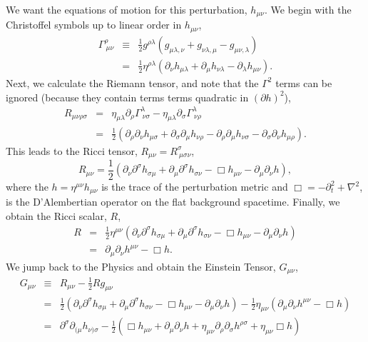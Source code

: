 We want the equations of motion for this perturbation, $h_{\mu\nu}$. We begin with the Christoffel symbols up to linear order in $h_{\mu\nu}$,
\begin{eqnarray}
    \Gamma^{\rho}_{\ \mu\nu}&\equiv&\frac{1}{2}g^{\rho\lambda}\left(g_{\mu\lambda,\nu} + g_{\nu\lambda, \mu} - g_{\mu\nu,\lambda}\right)\nonumber\\
    &=& \frac{1}{2}\eta^{\rho\lambda}(\partial_{\nu}h_{\mu\lambda} + \partial_{\mu}h_{\nu\lambda} - \partial_{\lambda}h_{\mu\nu}).
\end{eqnarray}
Next, we calculate the Riemann tensor, and note that the $\Gamma^2$ terms can be ignored (because they contain terms terms quadratic in $(\partial h)^2$),
\begin{eqnarray}
    R_{\mu\nu\rho\sigma} &=& \eta_{\mu\lambda}\partial_{\rho}\Gamma^{\lambda}_{\ \nu\sigma} - \eta_{\mu\lambda}\partial_{\sigma}\Gamma^{\lambda}_{\ \nu\rho}\nonumber \\
    &=& \frac{1}{2}\left(\partial_{\rho}\partial_{\nu}h_{\mu\sigma} + \partial_{\sigma}\partial_{\mu}h_{\nu\rho} - \partial_{\rho}\partial_{\mu}h_{\nu\sigma} - \partial_{\sigma}\partial_{\nu} h_{\mu\rho}\right).
\end{eqnarray}
This leads to the Ricci tensor, $R_{\mu\nu} = R^{\sigma}_{\ \mu\sigma\nu}$,
\begin{equation}
    R_{\mu\nu} = \frac{1}{2}\left(\partial_{\nu}\partial^{\sigma}h_{\sigma\mu} + \partial_{\mu}\partial^{\sigma}h_{\sigma\nu} - \Box h_{\mu\nu} - \partial_{\mu}\partial_{\nu}h\right),
\end{equation}
where the $h = \eta^{\mu\nu}h_{\mu\nu}$ is the trace of the perturbation metric and $\Box = - \partial_{t}^2 + \nabla^2$, is the D'Alembertian operator on the flat background spacetime. Finally, we obtain the Ricci scalar, $R$,
\begin{eqnarray}
    R &=& \frac{1}{2}\eta^{\mu\nu}\left(\partial_{\nu}\partial^{\sigma}h_{\sigma\mu} + \partial_{\mu}\partial^{\sigma}h_{\sigma\nu} - \Box h_{\mu\nu} - \partial_{\mu}\partial_{\nu}h\right)\nonumber\\
    &=& \partial_{\mu}\partial_{\nu}h^{\mu\nu} - \Box h.
\end{eqnarray}
We jump back to the Physics and obtain the Einstein Tensor, $G_{\mu\nu}$,
\begin{eqnarray}
G_{\mu\nu} &\equiv& R_{\mu\nu} - \frac{1}{2}R g_{\mu\nu}\nonumber\\
&=&\frac{1}{2}\left(\partial_{\nu}\partial^{\sigma}h_{\sigma\mu} + \partial_{\mu}\partial^{\sigma}h_{\sigma\nu} - \Box h_{\mu\nu} - \partial_{\mu}\partial_{\nu}h\right) - \frac{1}{2}\eta_{\mu\nu}\left(\partial_{\mu}\partial_{\nu}h^{\mu\nu} - \Box h\right)\nonumber\\
&=&\partial^{\sigma}\partial_{(\mu}h_{\nu)\sigma} - \frac{1}{2}\left(\Box h_{\mu\nu} + \partial_{\mu}\partial_{\nu}h + \eta_{\mu\nu}\partial_{\rho}\partial_{\sigma}h^{\rho\sigma} +\eta_{\mu\nu}\Box h \right)
\end{eqnarray}

